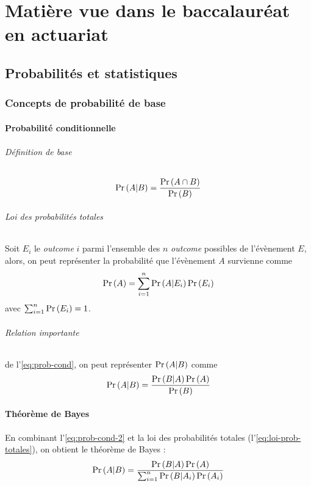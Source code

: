 \documentclass[12pt, french]{report}
\begin{document}
\part{Matière vue dans le baccalauréat en actuariat}

\chapter{Probabilités et statistiques}

\section{Concepts de probabilité de base}

\subsection{Probabilité conditionnelle}
\paragraph{Définition de base}
\begin{equation}
\label{eq:prob-cond}
\Pr \left( A|B \right) = \frac{\Pr \left( A \cap B \right)}{\Pr \left( B \right)}
\end{equation}

\paragraph{Loi des probabilités totales} Soit $E_i$ le \textit{outcome} $i$ parmi l'ensemble des $n$ \textit{outcome} possibles de l'évènement $E$, alors, on peut représenter la probabilité que l'évènement $A$ survienne comme
\begin{equation}
\label{eq:loi-prob-totales}
\Pr \left( A \right) = \sum_{i=1}^{n} \Pr \left( A | E_i \right) \Pr \left( E_i \right)
\end{equation}
avec $\sum_{i=1}^{n} \Pr \left( E_i \right) = 1$.

\paragraph{Relation importante} de l'\autoref{eq:prob-cond}, on peut représenter $\Pr \left( A|B \right)$ comme
\begin{equation}
\label{eq:prob-cond-2}
\Pr \left( A|B \right) = \frac{\Pr \left( B|A \right) \Pr \left( A \right)}{\Pr \left( B \right)}
\end{equation}

\subsection{Théorème de Bayes} En combinant l'\autoref{eq:prob-cond-2} et la loi des probabilités totales (l'\autoref{eq:loi-prob-totales}), on obtient le théorème de Bayes : 
\begin{equation}
\Pr \left( A|B \right) = \frac{\Pr \left( B|A \right) \Pr \left( A \right)}{\sum_{i=1}^{n} \Pr \left( B | A_i \right) \Pr \left( A_i \right)}
\end{equation}
\end{document}
